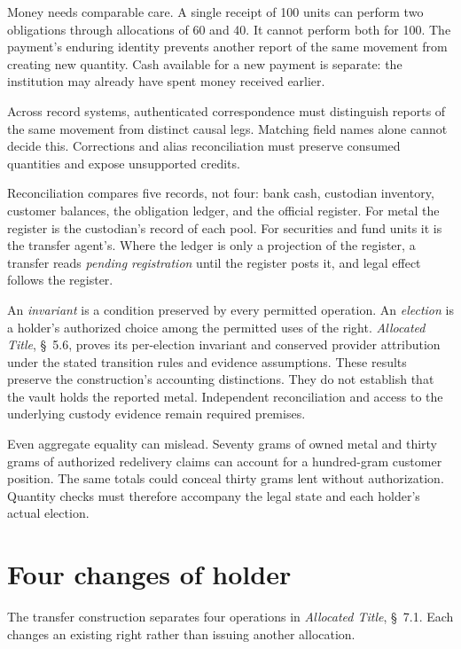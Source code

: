\documentclass{momentum}
\begin{document}
Money needs comparable care. A single receipt of 100 units can perform two obligations through allocations of 60 and 40. It cannot perform both for 100. The payment's enduring identity prevents another report of the same movement from creating new quantity. Cash available for a new payment is separate: the institution may already have spent money received earlier.

Across record systems, authenticated correspondence must distinguish reports of the same movement from distinct causal legs. Matching field names alone cannot decide this. Corrections and alias reconciliation must preserve consumed quantities and expose unsupported credits.

Reconciliation compares five records, not four: bank cash, custodian inventory, customer balances, the obligation ledger, and the official register. For metal the register is the custodian's record of each pool. For securities and fund units it is the transfer agent's. Where the ledger is only a projection of the register, a transfer reads \emph{pending registration} until the register posts it, and legal effect follows the register.

An \emph{invariant} is a condition preserved by every permitted operation. An \emph{election} is a holder's authorized choice among the permitted uses of the right. \emph{Allocated Title}, \S~5.6, proves its per-election invariant and conserved provider attribution under the stated transition rules and evidence assumptions. These results preserve the construction's accounting distinctions. They do not establish that the vault holds the reported metal. Independent reconciliation and access to the underlying custody evidence remain required premises.

Even aggregate equality can mislead. Seventy grams of owned metal and thirty grams of authorized redelivery claims can account for a hundred-gram customer position. The same totals could conceal thirty grams lent without authorization. Quantity checks must therefore accompany the legal state and each holder's actual election.

\section{Four changes of holder}

The transfer construction separates four operations in \emph{Allocated Title}, \S~7.1. Each changes an existing right rather than issuing another allocation.
\end{document}

